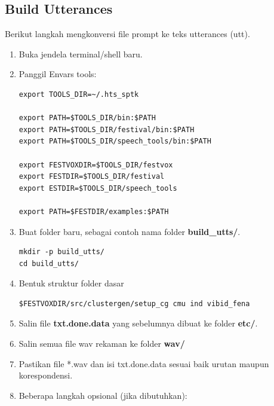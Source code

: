\documentclass[12pt,]{article}
\begin{document}
	\subsection{Build Utterances}
	
	Berikut langkah mengkonversi file prompt ke teks utterances (utt).
	
	\begin{enumerate}
		\item Buka jendela terminal/shell baru.
		
		\item Panggil Envars tools:
		\begin{verbatim}
export TOOLS_DIR=~/.hts_sptk

export PATH=$TOOLS_DIR/bin:$PATH
export PATH=$TOOLS_DIR/festival/bin:$PATH
export PATH=$TOOLS_DIR/speech_tools/bin:$PATH

export FESTVOXDIR=$TOOLS_DIR/festvox
export FESTDIR=$TOOLS_DIR/festival
export ESTDIR=$TOOLS_DIR/speech_tools

export PATH=$FESTDIR/examples:$PATH
		\end{verbatim}
		
		\item Buat folder baru, sebagai contoh nama folder \textbf{build\_utts/}.
		\begin{verbatim}
mkdir -p build_utts/
cd build_utts/
		\end{verbatim}
		
		\item Bentuk struktur folder dasar
		\begin{verbatim}
$FESTVOXDIR/src/clustergen/setup_cg cmu ind vibid_fena
		\end{verbatim}
		
		\item Salin file \textbf{txt.done.data} yang sebelumnya dibuat ke folder \textbf{etc/}.
		
		\item Salin semua file wav rekaman ke folder \textbf{wav/}
		
		\item Pastikan file *.wav dan isi txt.done.data sesuai baik urutan maupun korespondensi.
		
		\item Beberapa langkah opsional (jika dibutuhkan):
		

\end{enumerate}
\end{document}
